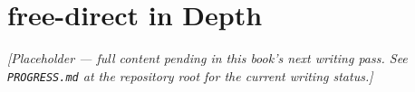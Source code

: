 \chapter{free-direct in Depth}
\label{ch:freedirect-deep-dive}

\emph{[Placeholder --- full content pending in this book's next writing pass. See \texttt{PROGRESS.md} at the repository root for the current writing status.]}
